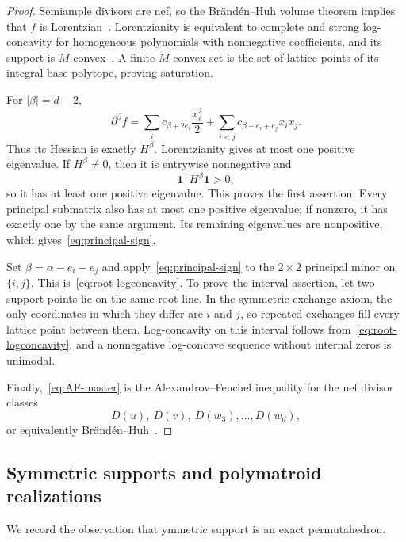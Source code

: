 \documentclass[11pt,a4paper,oneside]{amsart}
\numberwithin{equation}{section}
\theoremstyle{definition}
\theoremstyle{remark}
\newcommand{\one}{\mathbf 1}
\newcommand{\abs}[1]{\lvert#1\rvert}
\begin{document}
\begin{proof}
Semiample divisors are nef, so the Br\"and\'en--Huh volume theorem implies that $f$ is Lorentzian~\cite[Theorem~4.6]{BH20}.  Lorentzianity is equivalent to complete and strong log-concavity for homogeneous polynomials with nonnegative coefficients, and its support is $M$-convex~\cite[Theorems~2.25 and~2.30]{BH20}.  A finite $M$-convex set is the set of lattice points of its integral base polytope, proving saturation.

For $\abs\beta=d-2$,
\[
 \partial^\beta f
 =\sum_i c_{\beta+2e_i}\frac{x_i^2}{2}
   +\sum_{i<j}c_{\beta+e_i+e_j}x_ix_j.
\]
Thus its Hessian is exactly $H^\beta$.  Lorentzianity gives at most one positive eigenvalue.  If $H^\beta\neq0$, then it is entrywise nonnegative and
\[
 \one^{\mathsf T}H^\beta\one>0,
\]
so it has at least one positive eigenvalue.  This proves the first assertion.  Every principal submatrix also has at most one positive eigenvalue; if nonzero, it has exactly one by the same argument.  Its remaining eigenvalues are nonpositive, which gives~\eqref{eq:principal-sign}.

Set $\beta=\alpha-e_i-e_j$ and apply~\eqref{eq:principal-sign} to the $2\times2$ principal minor on $\{i,j\}$.  This is~\eqref{eq:root-logconcavity}.  To prove the interval assertion, let two support points lie on the same root line.  In the symmetric exchange axiom, the only coordinates in which they differ are $i$ and $j$, so repeated exchanges fill every lattice point between them.  Log-concavity on this interval follows from~\eqref{eq:root-logconcavity}, and a nonnegative log-concave sequence without internal zeros is unimodal.

Finally,~\eqref{eq:AF-master} is the Alexandrov--Fenchel inequality for the nef divisor classes
\[
 D(u),\ D(v),\ D(w_3),\ldots,D(w_d),
\]
or equivalently Br\"and\'en--Huh~\cite[Proposition~4.5]{BH20}.
\end{proof}

\subsection{Symmetric supports and polymatroid realizations}

We record the observation that ymmetric support is an exact permutahedron.
\end{document}
